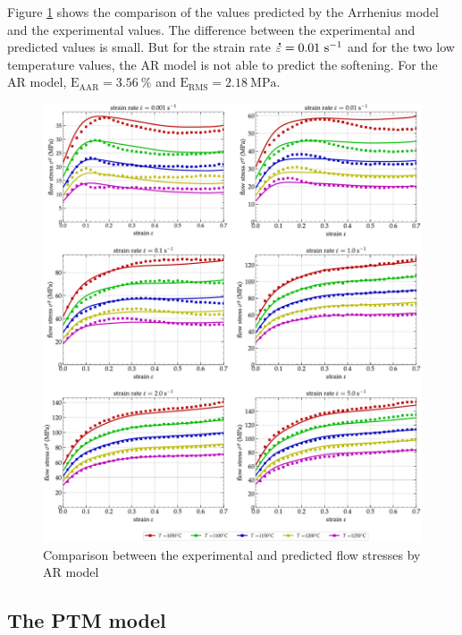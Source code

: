 \documentclass[twoside,english,1p,final,sort&compress]{elsarticle}
\theoremstyle{plain}
\DeclareRobustCommand{\mdot}[1]{\accentset{\mbox{\bfseries .}}{#1}}
\DeclareRobustCommand{\RMSE}{\text{E}_\text{RMS}}
\DeclareRobustCommand{\AARE}{\text{E}_\text{AAR}}
\DeclareRobustCommand{\ps}{\text{s}^{-1}}
\begin{document}
Figure \ref{fig:CompExp-AR-6} shows the comparison of the values predicted by the Arrhenius model and the experimental values.
The difference between the experimental and predicted values is small.
But for the strain rate $\mdot\varepsilon = 0.01~\ps$ and for the two low temperature values, the AR model is not able to predict the softening.
For the AR model, $\AARE=3.56~\%$ and $\RMSE=2.18~\text{MPa}$.

\begin{figure}[!ht]
\centering
\includegraphics[width=\columnwidth]
{Figures/CompExp-AR-6}
\caption{Comparison between the experimental and predicted flow stresses by AR model}
\label{fig:CompExp-AR-6}
\end{figure}

\subsection{The PTM model\label{sec:PTM}}
\end{document}
